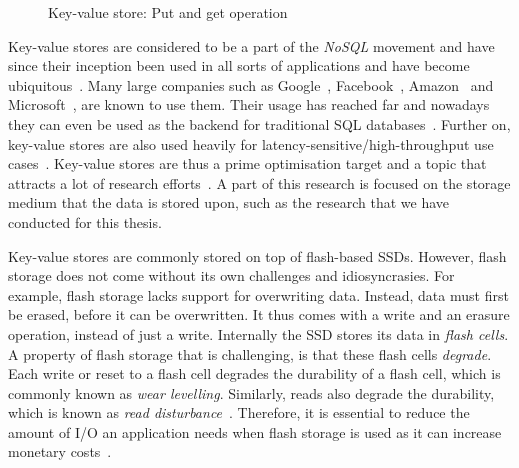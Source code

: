 \begin{figure}[h]
\centering
\begin{minipage}{0.45\textwidth}
  \centering
  
\end{minipage}%
\caption{ Key-value store: Put and get operation }
\label{fig:kvstore}
\end{figure}

Key-value stores are considered to be a part of the \textit{NoSQL} movement and have since their inception been used in all sorts of applications and have become ubiquitous~\cite{doekemeijer2022key}. Many large companies such as Google~\cite{chang2008bigtable,LevelDB}, Facebook~\cite{dong2021evolution}, Amazon~\cite{sivasubramanian2012amazon} and Microsoft~\cite{debnath2011skimpystash}, are known to use them.  Their usage has reached far and nowadays they can even be used as the backend for traditional SQL databases~\cite{matsunobu2020myrocks}. Further on, key-value stores are also used heavily for latency-sensitive/high-throughput use cases~\cite{lersch2020enabling,doekemeijer2022key}. Key-value stores are thus a prime optimisation target and a topic that attracts a lot of research efforts~\cite{doekemeijer2022key}. A part of this research is focused on the storage medium that the data is stored upon, such as the research that we have conducted for this thesis. 

Key-value stores are commonly stored on top of flash-based SSDs.
However, flash storage does not come without its own challenges and idiosyncrasies. For example, flash storage lacks support for overwriting data. Instead, data must first be erased, before it can be overwritten. It thus comes with a write and an erasure operation, instead of just a write. Internally the SSD stores its data in \textit{flash cells}. A property of flash storage that is challenging, is that these flash cells \textit{degrade}. Each write or reset to a flash cell degrades the durability of a flash cell, which is commonly known as \textit{wear levelling}. Similarly, reads also degrade the durability, which is known as \textit{read disturbance}~\cite{liu2015read}. Therefore, it is essential to reduce the amount of I/O an application needs when flash storage is used as it can increase monetary costs~\cite{agrawal2008design}.

